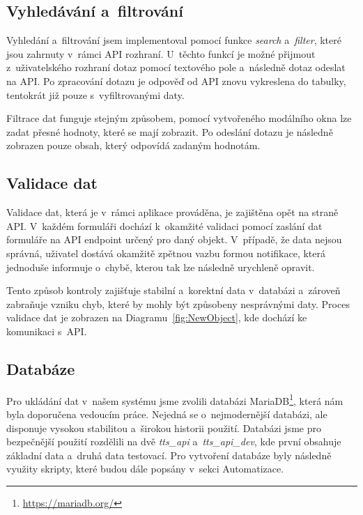 

\subsection{Vyhledávání a~filtrování}
\label{subsec:implementation-technologies-search}
Vyhledání a~filtrování jsem implementoval pomocí funkce \textit{search} a~\textit{filter}, které jsou zahrnuty v~rámci API rozhraní. U~těchto funkcí je možné přijmout z~uživatelského rozhraní dotaz pomocí textového pole a~následně dotaz odeslat na API. Po zpracování dotazu je odpověď od API znovu vykreslena do tabulky, tentokrát již pouze s~vyfiltrovanými daty.

Filtrace dat funguje stejným způsobem, pomocí vytvořeného modálního okna lze zadat přesné hodnoty, které se mají zobrazit. Po odeslání dotazu je následně zobrazen pouze obsah, který odpovídá zadaným hodnotám.

\subsection{Validace dat}
\label{subsec:implementation-technologies-validation}
Validace dat, která je v~rámci aplikace prováděna, je zajištěna opět na straně API. V~každém formuláři dochází k~okamžité validaci pomocí zaslání dat formuláře na API endpoint určený pro daný objekt. V~případě, že data nejsou správná, uživatel dostává okamžitě zpětnou vazbu formou notifikace, která jednoduše informuje o~chybě, kterou tak lze následně urychleně opravit.

Tento způsob kontroly zajišťuje stabilní a~korektní data v~databázi a~zároveň zabraňuje vzniku chyb, které by mohly být způsobeny nesprávnými daty. Proces validace dat je zobrazen na Diagramu~\ref{fig:NewObject}, kde dochází ke komunikaci s~API\@.

\subsection{Databáze}
\label{subsec:implementation-technologies-database}
Pro ukládání dat v~našem systému jsme zvolili databázi MariaDB\footnote{\href{https://mariadb.org/}{https://mariadb.org/}}, která nám byla doporučena vedoucím práce. Nejedná se o~nejmodernější databázi, ale disponuje vysokou stabilitou a~širokou historii použití. Databázi jsme pro bezpečnější použití rozdělili na dvě \textit{tts\_api} a~\textit{tts\_api\_dev}, kde první obsahuje základní data a~druhá data testovací. Pro vytvoření databáze byly následně využity skripty, které budou dále popsány v~sekci Automatizace.

